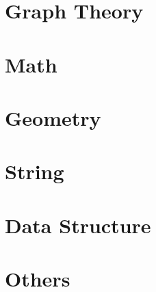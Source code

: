 \documentclass[titlepage, openany]{book}
\newcommand{\mychapter}[2]{
    \chapter{#1}
    
    \cleardoublepage
}
\begin{document}
    \cleardoublepage
    \setcounter{page}{1}
    \tableofcontents
    \cleardoublepage
    \setcounter{page}{1}

    \mychapter{Graph Theory}{graph_theory.tex}
    \mychapter{Math}{math.tex}
    \mychapter{Geometry}{geometry.tex}
    \mychapter{String}{string.tex}
    \mychapter{Data Structure}{data_structure.tex}
    \mychapter{Others}{others.tex}
\end{document}
